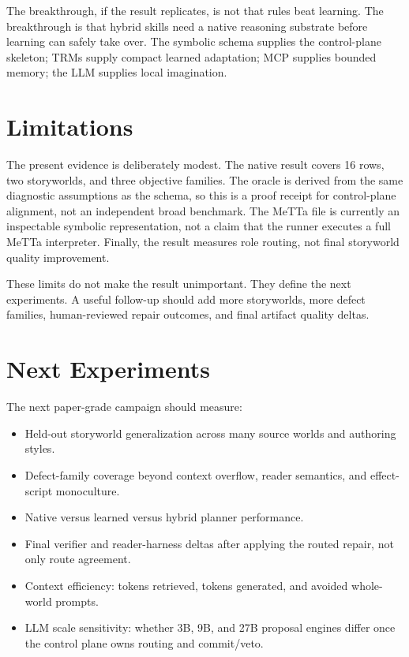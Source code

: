 \documentclass[11pt]{article}
\begin{document}
The breakthrough, if the result replicates, is not that rules beat learning. The breakthrough is that hybrid skills need a native reasoning substrate before learning can safely take over. The symbolic schema supplies the control-plane skeleton; TRMs supply compact learned adaptation; MCP supplies bounded memory; the LLM supplies local imagination.

\section{Limitations}

The present evidence is deliberately modest. The native result covers 16 rows, two storyworlds, and three objective families. The oracle is derived from the same diagnostic assumptions as the schema, so this is a proof receipt for control-plane alignment, not an independent broad benchmark. The MeTTa file is currently an inspectable symbolic representation, not a claim that the runner executes a full MeTTa interpreter. Finally, the result measures role routing, not final storyworld quality improvement.

These limits do not make the result unimportant. They define the next experiments. A useful follow-up should add more storyworlds, more defect families, human-reviewed repair outcomes, and final artifact quality deltas.

\section{Next Experiments}

The next paper-grade campaign should measure:

\begin{itemize}
  \item Held-out storyworld generalization across many source worlds and authoring styles.
  \item Defect-family coverage beyond context overflow, reader semantics, and effect-script monoculture.
  \item Native versus learned versus hybrid planner performance.
  \item Final verifier and reader-harness deltas after applying the routed repair, not only route agreement.
  \item Context efficiency: tokens retrieved, tokens generated, and avoided whole-world prompts.
  \item LLM scale sensitivity: whether 3B, 9B, and 27B proposal engines differ once the control plane owns routing and commit/veto.
\end{itemize}
\end{document}

